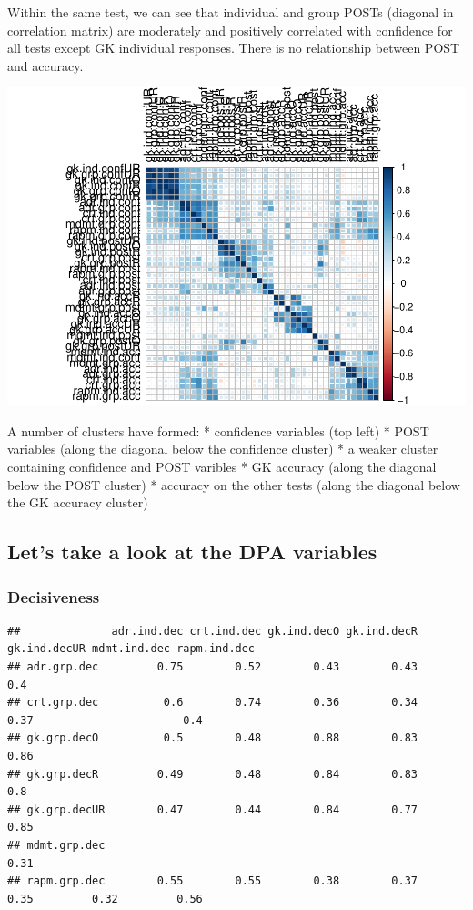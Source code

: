 \documentclass[]{article}
\begin{document}
Within the same test, we can see that individual and group POSTs
(diagonal in correlation matrix) are moderately and positively
correlated with confidence for all tests except GK individual responses.
There is no relationship between POST and accuracy.

\includegraphics{corr_analyses_files/figure-latex/post4-1.pdf}

A number of clusters have formed: * confidence variables (top left) *
POST variables (along the diagonal below the confidence cluster) * a
weaker cluster containing confidence and POST varibles * GK accuracy
(along the diagonal below the POST cluster) * accuracy on the other
tests (along the diagonal below the GK accuracy cluster)

\subsection{Let's take a look at the DPA
variables}\label{lets-take-a-look-at-the-dpa-variables}

\subsubsection{Decisiveness}\label{decisiveness}

\begin{verbatim}
##              adr.ind.dec crt.ind.dec gk.ind.decO gk.ind.decR gk.ind.decUR mdmt.ind.dec rapm.ind.dec
## adr.grp.dec         0.75        0.52        0.43        0.43          0.4                          
## crt.grp.dec          0.6        0.74        0.36        0.34         0.37                       0.4
## gk.grp.decO          0.5        0.48        0.88        0.83         0.86                          
## gk.grp.decR         0.49        0.48        0.84        0.83          0.8                          
## gk.grp.decUR        0.47        0.44        0.84        0.77         0.85                          
## mdmt.grp.dec                                                                      0.31             
## rapm.grp.dec        0.55        0.55        0.38        0.37         0.35         0.32         0.56
\end{verbatim}
\end{document}
